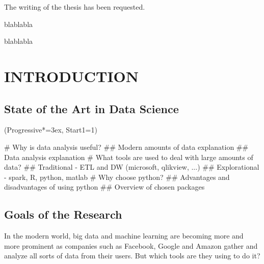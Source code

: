 \documentclass[12pt, a4paper]{article}
\let\OldEasylist\easylist
\let\OldEndEasylist\endeasylist
\renewenvironment{easylist}{%
    \OldEasylist%
    \ListProperties(Progressive*=3ex, Start1=1)%
}{%
    \OldEndEasylist%
}%
\newenvironment{abstractpage}
  {\cleardoublepage\vspace*{\fill}\thispagestyle{empty}}
  {\vfill\cleardoublepage}
\renewenvironment{abstract}[1]
  {\bigskip\selectlanguage{#1}%
   \begin{center}\bfseries\abstractname\end{center}}
  {\par\bigskip}
\begin{document}


\vspace*{\fill}
\begin{center}
The writing of the thesis has been requested.
\end{center}
\vspace{\fill}
\newpage

\tableofcontents
\newpage

\newpage

\begin{abstractpage}
\begin{abstract}{polish}
    blablabla
\end{abstract}

\begin{abstract}{british}
    blablabla
\end{abstract}
\end{abstractpage}




\newpage
\section{INTRODUCTION}

\subsection{State of the Art in Data Science}
\begin{easylist}
# Why is data analysis useful?
## Modern amounts of data explanation
## Data analysis explanation
# What tools are used to deal with large amounts of data?
## Traditional - ETL and DW (microsoft, qlikview, ...)
## Explorational - spark, R, python, matlab
# Why choose python?
## Advantages and disadvantages of using python
## Overview of chosen packages
\end{easylist}

\subsection{Goals of the Research}
In the modern world, big data and machine learning are becoming more and more prominent as companies such as Facebook, Google and Amazon gather and analyze all sorts of data from their users. But which tools are they using to do it?
\end{document}
